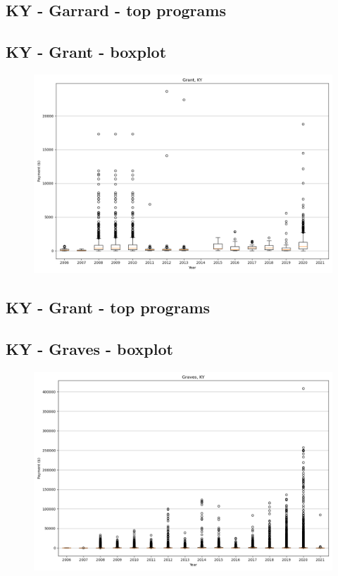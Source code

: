 \subsection*{KY - Garrard - top programs}

\newpage
\subsection*{KY - Grant - boxplot}
\begin{figure}[h]
\centering
\includegraphics[width=7in]{../output/boxplots/counties/Grant-KY_boxplot.png}
\end{figure}


\subsection*{KY - Grant - top programs}

\newpage
\subsection*{KY - Graves - boxplot}
\begin{figure}[h]
\centering
\includegraphics[width=7in]{../output/boxplots/counties/Graves-KY_boxplot.png}
\end{figure}


